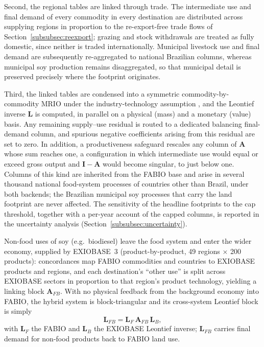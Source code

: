Second, the regional tables are linked through trade. The intermediate use
and final demand of every commodity in every destination are distributed
across supplying regions in proportion to the re-export-free trade flows of
Section~\ref{subsubsec:reexport}; grazing and stock withdrawals are treated
as fully domestic, since neither is traded internationally. Municipal
livestock use and final demand are subsequently re-aggregated to national
Brazilian columns, whereas municipal soy production remains disaggregated,
so that municipal detail is preserved precisely where the footprint
originates.

Third, the linked tables are condensed into a symmetric
commodity-by-commodity MRIO under the industry-technology assumption
\cite{millerblair2009}, and the Leontief inverse $\mathbf{L}$ is computed,
in parallel on a physical (mass) and a monetary (value) basis. Any remaining
supply--use residual is routed to a dedicated balancing final-demand column,
and spurious negative coefficients arising from this residual are set to
zero. In addition, a productiveness safeguard rescales any column of
$\mathbf{A}$ whose sum reaches one, a configuration in which intermediate
use would equal or exceed gross output and $\mathbf{I}-\mathbf{A}$ would
become singular, to just below one. Columns of this kind are inherited from
the FABIO base and arise in several thousand national food-system processes
of countries other than Brazil, under both backends; the Brazilian municipal
soy processes that carry the land footprint are never affected. The
sensitivity of the headline footprints to the cap threshold, together with a
per-year account of the capped columns, is reported in the uncertainty
analysis (Section~\ref{subsubsec:uncertainty}).

Non-food uses of soy (e.g.\ biodiesel) leave the food system and enter the
wider economy, supplied by EXIOBASE~3 \cite{stadler2018exiobase}
(product-by-product, 49 regions $\times$ 200 products): concordances map
FABIO commodities and countries to EXIOBASE products and regions, and each
destination's ``other use'' is split across EXIOBASE sectors in proportion
to that region's product technology, yielding a linking block
$\mathbf{A}_{FB}$. With no physical feedback from the background economy
into FABIO, the hybrid system is block-triangular and its cross-system
Leontief block is simply
\begin{equation}\label{eq:hybridinv}
  \mathbf{L}_{FB}=\mathbf{L}_F\,\mathbf{A}_{FB}\,\mathbf{L}_B,
\end{equation}
with $\mathbf{L}_F$ the FABIO and $\mathbf{L}_B$ the EXIOBASE Leontief
inverse; $\mathbf{L}_{FB}$ carries final demand for non-food products back
to FABIO land use.

